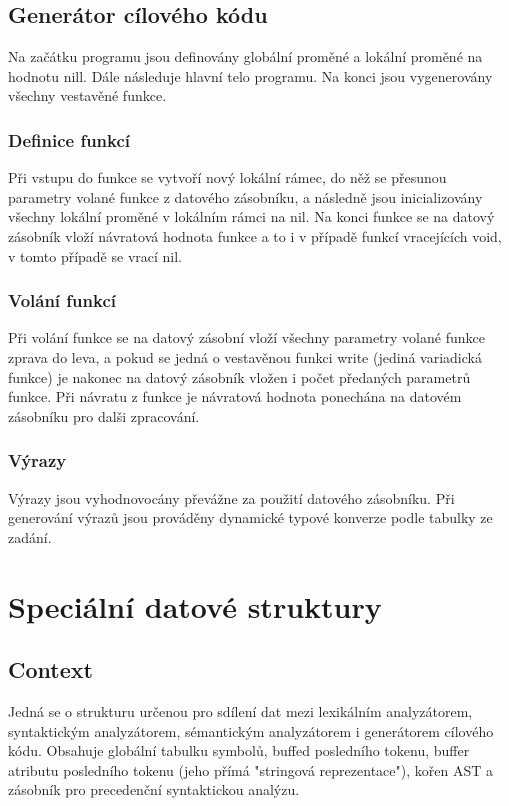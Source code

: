 \documentclass[a4paper, 11pt]{article}
\begin{document}
	\subsection{Generátor cílového kódu}
	Na začátku programu jsou definovány globální proměné a lokální proměné na hodnotu nill. Dále následuje hlavní telo programu. Na konci jsou vygenerovány 
	všechny vestavěné funkce.
	\subsubsection{Definice funkcí}
	Při vstupu do funkce se vytvoří nový lokální rámec, do něž se přesunou parametry volané funkce z datového zásobníku, a následně jsou inicializovány 
	všechny lokální proměné v lokálním rámci na nil. Na konci funkce se na datový zásobník vloží návratová hodnota funkce a to i v případě funkcí vracejících 
	void, v tomto případě se vrací nil.
	\subsubsection{Volání funkcí}
	Při volání funkce se na datový zásobní vloží všechny parametry volané funkce zprava do leva, a pokud se jedná o vestavěnou funkci write (jediná variadická 
	funkce) je nakonec na datový zásobník vložen i počet předaných parametrů funkce. Při návratu z funkce je návratová hodnota ponechána na datovém 
	zásobníku pro dalši zpracování.
	\subsubsection{Výrazy}
	Výrazy jsou vyhodnovocány převážne za použití datového zásobníku. Při generování výrazů jsou prováděny dynamické typové konverze podle tabulky ze 
	zadání.
	\section{Speciální datové struktury}
	\subsection{Context}
	\label{cont}
	Jedná se o strukturu určenou pro sdílení dat mezi lexikálním analyzátorem, syntaktickým analyzátorem, sémantickým analyzátorem i generátorem cílového 
	kódu. Obsahuje globální tabulku symbolů, buffed posledního tokenu, buffer atributu posledního tokenu (jeho přímá "stringová reprezentace"), kořen AST a 
	zásobník pro precedenční syntaktickou analýzu.
\end{document}
